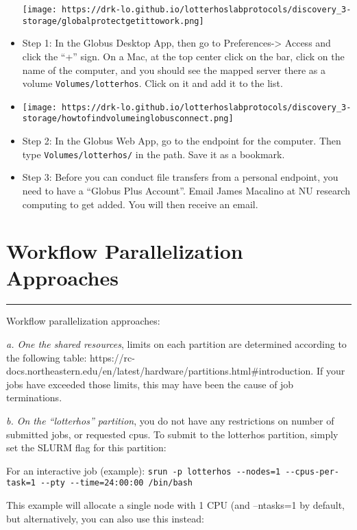 \documentclass[
  letterpaper,
  DIV=11,
  numbers=noendperiod]{scrreprt}
\begin{document}
\begin{itemize}
  \texttt{[image: https://drk-lo.github.io/lotterhoslabprotocols/discovery\_3-storage/globalprotectgetittowork.png]}
\item
  Step 1: In the Globus Desktop App, then go to
  Preferences-\textgreater{} Access and click the ``+'' sign. On a Mac,
  at the top center click on the bar, click on the name of the computer,
  and you should see the mapped server there as a volume
  \texttt{Volumes/lotterhos}. Click on it and add it to the list.
\item
  \texttt{[image: https://drk-lo.github.io/lotterhoslabprotocols/discovery\_3-storage/howtofindvolumeinglobusconnect.png]}
\item
  Step 2: In the Globus Web App, go to the endpoint for the computer.
  Then type \texttt{Volumes/lotterhos/} in the path. Save it as a
  bookmark.
\item
  Step 3: Before you can conduct file transfers from a personal
  endpoint, you need to have a ``Globus Plus Account''. Email James
  Macalino at NU research computing to get added. You will then receive
  an email.
\end{itemize}

\hypertarget{workflow-parallelization-approaches}{%
\chapter{Workflow Parallelization
Approaches}\label{workflow-parallelization-approaches}}

\begin{center}\rule{0.5\linewidth}{0.5pt}\end{center}

Workflow parallelization approaches:

\emph{a. One the shared resources}, limits on each partition are
determined according to the following table:
https://rc-docs.northeastern.edu/en/latest/hardware/partitions.html\#introduction.
If your jobs have exceeded those limits, this may have been the cause of
job terminations.

\emph{b. On the ``lotterhos'' partition}, you do not have any
restrictions on number of submitted jobs, or requested cpus. To submit
to the lotterhos partition, simply set the SLURM flag for this
partition:

For an interactive job (example):
\texttt{srun\ -p\ lotterhos\ -\/-nodes=1\ -\/-cpus-per-task=1\ -\/-pty\ -\/-time=24:00:00\ /bin/bash}

This example will allocate a single node with 1 CPU (and --ntasks=1 by
default, but alternatively, you can also use this instead:
\end{document}
